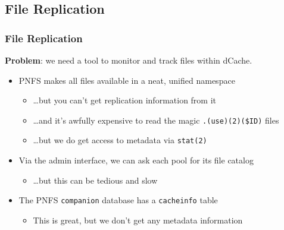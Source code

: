 \documentclass{beamer}
\begin{document}
\subsection{File Replication}
\begin{frame}
\frametitle{File Replication}
{\large {\bf Problem}: we need a tool to monitor and track files within dCache.}
\vspace{1 cm}
\begin{itemize}
    \item PNFS makes all files available in a neat, unified namespace
    \begin{itemize}
        \item \dots{}but you can't get replication information from it
        \item \dots{}and it's awfully expensive to read the magic {\tt .(use)(2)(\$ID)} files
        \item \dots{}but we do get access to metadata via {\tt stat(2)}
    \end{itemize}
    \item Via the admin interface, we can ask each pool for its file catalog
    \begin{itemize}
        \item \dots{}but this can be tedious and slow
    \end{itemize}
    \item The PNFS {\tt companion} database has a {\tt cacheinfo} table
    \begin{itemize}
        \item This is great, but we don't get any metadata information
    \end{itemize}
\end{itemize}
\end{frame}
\end{document}
